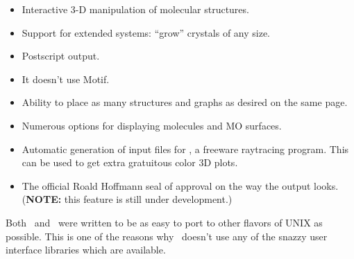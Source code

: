 \begin{itemize}

\item Interactive 3-D manipulation of molecular structures.

\item Support for extended systems: ``grow'' crystals of any size.

\item Postscript output.

\item It doesn't use Motif.

\item Ability to place as many structures and graphs as desired on the same page. 

\item Numerous options for displaying molecules and MO surfaces.

\item Automatic generation of input files for , a
freeware raytracing program.  This can be used to get extra gratuitous
color 3D plots.

\item The official Roald Hoffmann seal of approval on the way the output looks.
 ({\bf NOTE:} this feature is still under development.)

\end{itemize}

Both \calcprog\ and \viewprog\ were written to be as easy to port to
other flavors of UNIX as possible.  This is one of the
reasons why \viewprog\ doesn't use any of the snazzy user interface
libraries which are available.


